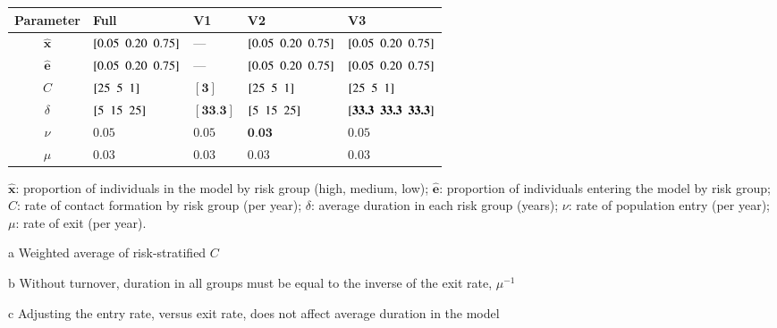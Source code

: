 \begin{threeparttable}
\begin{tabularx}{0.95\linewidth}{c *{4}{Y}}
	\toprule
	  Parameter    & Full                     & V1                           & V2                       & V3                                         \\
	\midrule
	$\bm{\hat{x}}$ & $[ 0.05\enspace0.20\enspace0.75 ]$ & ---                          & $[ 0.05\enspace0.20\enspace0.75 ]$ & $[ 0.05\enspace0.20\enspace0.75 ]$                   \\
	$\bm{\hat{e}}$ & $[ 0.05\enspace0.20\enspace0.75 ]$ & ---                          & $[ 0.05\enspace0.20\enspace0.75 ]$ & $[ 0.05\enspace0.20\enspace0.75 ]$                   \\
	     $C$       & $[ 25\enspace5\enspace1 ]$         & $[ \textbf{3} ]$    & $[ 25\enspace5\enspace1 ]$         & $[ 25\enspace5\enspace1 ]$                           \\
	   $\delta$    & $[ 5\enspace15\enspace25 ]$        & $[ \textbf{33.3} ]$ & $[ 5\enspace15\enspace25 ]$        & $[ \textbf{33.3\enspace33.3\enspace33.3} ]$ \\
	    $\nu$      & $0.05$                   & $0.05$                       & $\textbf{0.03}$ & $0.05$                                     \\
	    $\mu$      & $0.03$                   & $0.03$                       & $0.03$                   & $0.03$                                     \\
	\bottomrule
\end{tabularx}
\footnotesize
\begin{tablenotes}
  \item
  $\bm{\hat{x}}$: proportion of individuals in the model by risk group (high, medium, low);
  $\bm{\hat{e}}$: proportion of individuals entering the model by risk group;
  $C$: rate of contact formation by risk group (per year);
  $\delta$: average duration in each risk group (years);
  $\nu$: rate of population entry (per year);
  $\mu$: rate of exit (per year).
  \item[a] Weighted average of risk-stratified $C$
  \item[b] Without turnover, duration in all groups must be equal to the inverse of the exit rate, $\mu^{-1}$
  \item[c] Adjusting the entry rate, versus exit rate, does not affect average duration in the model
\end{tablenotes}
\end{threeparttable}
